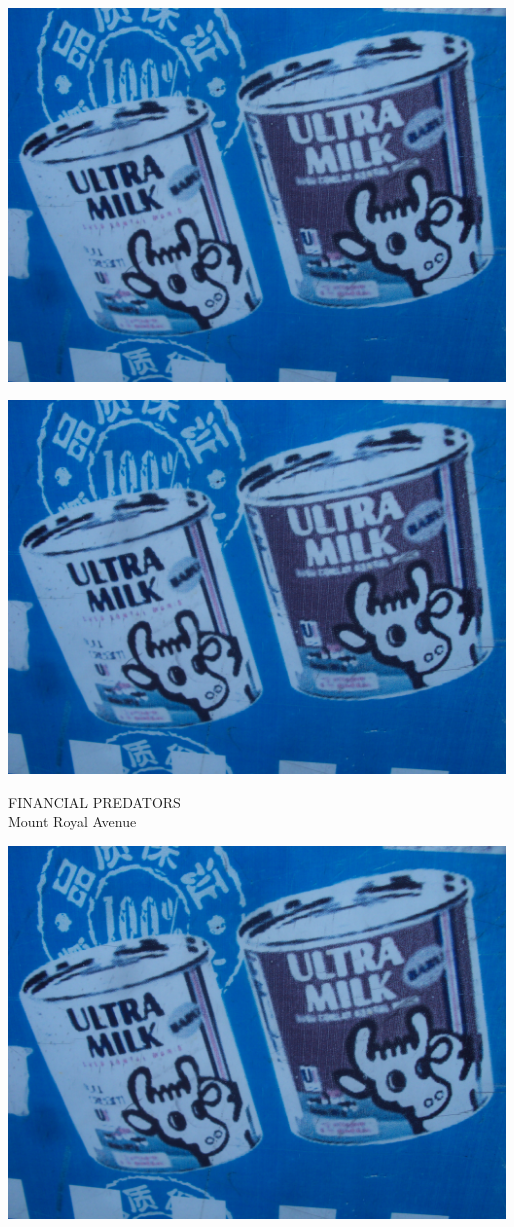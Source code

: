 \documentclass[10pt,letterpaper]{article}
\begin{document}
\includegraphics[width=5.19in]{landscape.jpg}

\vspace{0.25in}
\includegraphics[width=5.19in]{landscape.jpg}

FINANCIAL PREDATORS\\
Mount Royal Avenue\\
\pagebreak

\includegraphics[width=5.19in]{landscape.jpg}
\end{document}
